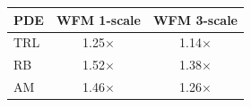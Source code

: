 \begin{tabular}{lcc}
\toprule
\textbf{PDE} & \textbf{WFM 1-scale} & \textbf{WFM 3-scale} \\
\midrule
TRL & 1.25$\times$ & 1.14$\times$ \\
RB & 1.52$\times$ & 1.38$\times$ \\
AM & 1.46$\times$ & 1.26$\times$ \\
\bottomrule
\end{tabular}
